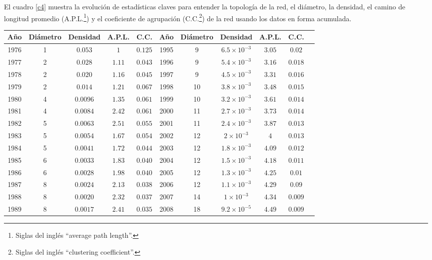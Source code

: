 \documentclass[12pt,letter]{article}
\begin{document}
\vspace{0.5cm}

El cuadro \ref{c4} muestra la evolución de estadísticas claves para entender la topología de la red, el diámetro, la densidad, el camino de longitud promedio (A.P.L.\footnote{Siglas del inglés ``average path length''.}) y el coeficiente de agrupación (C.C.\footnote{Siglas del inglés ``clustering coefficient''.}) de la red usando los datos en forma acumulada.


\begin{table}[h!]
\centering
\resizebox{16cm}{!} {
\begin{tabular}{ccccccccccc}
\textbf{Año} & \textbf{Diámetro} & \textbf{Densidad} &\textbf{A.P.L.} & \textbf{C.C.} & \textbf{Año} & \textbf{Diámetro} & \textbf{Densidad} & \textbf{A.P.L.} & \textbf{C.C.} \\ \hline 
1976 & 1& $0.053$&$1$ & $0.125$&1995 &9 &$6.5 \times 10^{-3}$ & $3.05$&$0.02$\\
1977 & 2& $0.028$&$1.11$ &$0.043$ &1996&9 &$5.4 \times 10^{-3}$ & $3.16$&$0.018$\\
1978 & 2& $0.020$&$1.16$ &$0.045$ &1997 & 9& $4.5 \times 10^{-3}$& $3.31$&$0.016$\\
1979 & 2& $0.014$&$1.21$ &$0.067$ &1998 &10 &$3.8 \times 10^{-3}$ & $3.48$&$0.015$\\
1980 & 4& $0.0096$&$1.35$ &$0.061$ &1999 & 10&$3.2 \times 10^{-3}$ & $3.61$&$0.014$\\
1981 & 4& $0.0084$&$2.42$ &$0.061$ &2000 &11 & $2.7 \times 10^{-3}$& $3.73$&$0.014$\\
1982 & 5& $0.0063$&$2.51$ &$0.055$ &2001 & 11&$2.4 \times 10^{-3}$ & $3.87$&$0.013$\\
1983 & 5& $0.0054$&$1.67$ &$0.054$ &2002 &12 &$2 \times 10^{-3}$ & $4$&$0.013$\\
1984 & 5& $0.0041$&$1.72$ &$0.044$ &2003 &12 & $1.8 \times 10^{-3}$& $4.09$&$0.012$\\
1985 & 6& $0.0033$&$1.83$ &$0.040$ &2004 & 12&$1.5 \times 10^{-3}$ & $4.18$&$0.011$\\
1986 & 6& $0.0028$&$1.98$ &$0.040$ & 2005&12 &$1.3 \times 10^{-3}$ & $4.25$&$0.01$\\
1987 & 8& $0.0024$&$2.13$ &$0.038$ &2006& 12&$1.1 \times 10^{-3}$ & $4.29$&$0.09$\\
1988 & 8& $0.0020$&$2.32$ & $0.037$&2007 &14 &$1 \times 10^{-3}$ & $4.34$&$0.009$\\
1989 & 8& $0.0017$&$2.41$ &$0.035$ &2008 &18 &$9.2 \times 10^{-5}$ & $4.49$&$0.009$\\

\end{tabular}}
\end{table}
\end{document}
